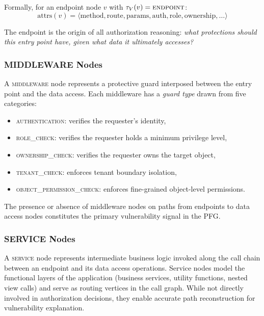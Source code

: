 Formally, for an endpoint node $v$ with $\tau_V(v) = \textsc{endpoint}$:
\begin{equation}
\text{attrs}(v) = \langle \text{method}, \text{route}, \text{params}, \text{auth}, \text{role}, \text{ownership}, \ldots \rangle
\end{equation}

The endpoint is the origin of all authorization reasoning: \emph{what protections should this entry point have, given what data it ultimately accesses?}

\subsubsection{MIDDLEWARE Nodes}

A \textsc{middleware} node represents a protective guard interposed between the entry point and the data access. Each middleware has a \emph{guard type} drawn from five categories:
\begin{itemize}
    \item \textsc{authentication}: verifies the requester's identity,
    \item \textsc{role\_check}: verifies the requester holds a minimum privilege level,
    \item \textsc{ownership\_check}: verifies the requester owns the target object,
    \item \textsc{tenant\_check}: enforces tenant boundary isolation,
    \item \textsc{object\_permission\_check}: enforces fine-grained object-level permissions.
\end{itemize}

The presence or absence of middleware nodes on paths from endpoints to data access nodes constitutes the primary vulnerability signal in the PFG.

\subsubsection{SERVICE Nodes}

A \textsc{service} node represents intermediate business logic invoked along the call chain between an endpoint and its data access operations. Service nodes model the functional layers of the application (business services, utility functions, nested view calls) and serve as routing vertices in the call graph. While not directly involved in authorization decisions, they enable accurate path reconstruction for vulnerability explanation.

